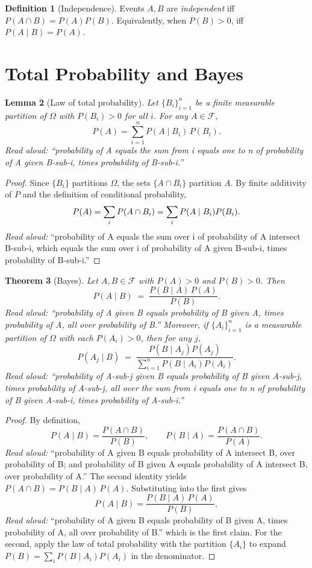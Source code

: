 \documentclass[11pt]{article}
\newtheorem{theorem}{Theorem}
\newtheorem{lemma}[theorem]{Lemma}
\theoremstyle{definition}
\newtheorem{definition}[theorem]{Definition}
\begin{document}
\begin{definition}[Independence]
Events $A, B$ are \emph{independent} iff $P(A \cap B) = P(A) P(B)$.
Equivalently, when $P(B) > 0$, iff $P(A \mid B) = P(A)$.
\end{definition}

\section{Total Probability and Bayes}

\begin{lemma}[Law of total probability]
Let $\{B_i\}_{i=1}^n$ be a finite measurable partition of $\Omega$ with
$P(B_i) > 0$ for all $i$. For any $A \in \mathcal{F}$,
\[
P(A) = \sum_{i=1}^n P(A \mid B_i)\, P(B_i).
\]
\emph{Read aloud:} ``probability of A equals the sum from i equals one to n of probability of A given B-sub-i, times probability of B-sub-i.''
\end{lemma}

\begin{proof}
Since $\{B_i\}$ partitions $\Omega$, the sets $\{A \cap B_i\}$ partition $A$.
By finite additivity of $P$ and the definition of conditional probability,
\[
P(A) = \sum_i P(A \cap B_i) = \sum_i P(A \mid B_i) P(B_i). \qedhere
\]
\emph{Read aloud:} ``probability of A equals the sum over i of probability of A intersect B-sub-i, which equals the sum over i of probability of A given B-sub-i, times probability of B-sub-i.''
\end{proof}

\begin{theorem}[Bayes]
Let $A, B \in \mathcal{F}$ with $P(A) > 0$ and $P(B) > 0$. Then
\[
P(A \mid B) \;=\; \frac{P(B \mid A)\, P(A)}{P(B)}.
\]
\emph{Read aloud:} ``probability of A given B equals probability of B given A, times probability of A, all over probability of B.''
Moreover, if $\{A_i\}_{i=1}^n$ is a measurable partition of $\Omega$ with
each $P(A_i) > 0$, then for any $j$,
\[
P(A_j \mid B) \;=\; \frac{P(B \mid A_j) P(A_j)}{\sum_{i=1}^n P(B \mid A_i) P(A_i)}.
\]
\emph{Read aloud:} ``probability of A-sub-j given B equals probability of B given A-sub-j, times probability of A-sub-j, all over the sum from i equals one to n of probability of B given A-sub-i, times probability of A-sub-i.''
\end{theorem}

\begin{proof}
By definition,
\[
P(A \mid B) = \frac{P(A \cap B)}{P(B)}, \qquad
P(B \mid A) = \frac{P(A \cap B)}{P(A)}.
\]
\emph{Read aloud:} ``probability of A given B equals probability of A intersect B, over probability of B; and probability of B given A equals probability of A intersect B, over probability of A.''
The second identity yields $P(A \cap B) = P(B \mid A)\, P(A)$. Substituting
into the first gives
\[
P(A \mid B) = \frac{P(B \mid A)\, P(A)}{P(B)},
\]
\emph{Read aloud:} ``probability of A given B equals probability of B given A, times probability of A, all over probability of B.''
which is the first claim. For the second, apply the law of total probability
with the partition $\{A_i\}$ to expand $P(B) = \sum_i P(B \mid A_i) P(A_i)$
in the denominator. \qedhere
\end{proof}
\end{document}
